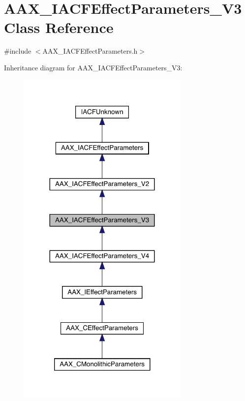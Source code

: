 \hypertarget{a01681}{}\section{A\+A\+X\+\_\+\+I\+A\+C\+F\+Effect\+Parameters\+\_\+\+V3 Class Reference}
\label{a01681}


{\ttfamily \#include $<$A\+A\+X\+\_\+\+I\+A\+C\+F\+Effect\+Parameters.\+h$>$}



Inheritance diagram for A\+A\+X\+\_\+\+I\+A\+C\+F\+Effect\+Parameters\+\_\+\+V3\+:
\nopagebreak
\begin{figure}[H]
\begin{center}
\leavevmode
\includegraphics[width=239pt]{a01680}
\end{center}
\end{figure}


